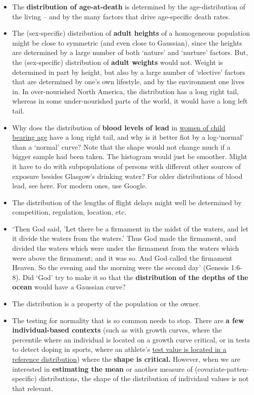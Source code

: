 \documentclass[]{book}
\begin{document}
\begin{itemize}
\item
  The \textbf{distribution of age-at-death} is determined by the age-distribution of the living -- and by the many factors that drive age-specific death rates.
\item
  The (sex-specific) distribution of \textbf{adult heights} of a homogeneous population might be close to symmetric (and even close to Gaussian), since the heights are determined by a large number of both `nature' and `nurture' factors. But, the (sex-specific) distribution of \textbf{adult weights} would not. Weight is determined in part by height, but also by a large number of `elective' factors that are determined by one's own lifestyle, and by the environment one lives in. In over-nourished North America, the distribution has a long right tail, whereas in some under-nourished parts of the world, it would have a long left tail.
\item
  Why does the distribution of \textbf{blood levels of lead} in
  \href{http://www.medicine.mcgill.ca/epidemiology/hanley/c607/ch01/homegrown_exercises_01.pdf\#page=2}{women of child bearing age} have a long right tail, and why is it better fiot by a log-`normal' than a `normal' curve? Note that the shape would not change much if a bigger sample had been taken. The histogram would just be smoother. Might it have to do with subpopulations of persons with different other sources of exposure besides Glasgow's drinking water? For older distributions of blood lead, see here. For modern ones, use Google.
\item
  The distribution of the lengths of flight delays might well be determined by competition, regulation, location, etc.
\item
  `Then God said, 'Let there be a firmament in the midst of the waters, and let it divide the waters from the waters.' Thus God made the firmament, and divided the waters which were under the firmament from the waters which were above the firmament; and it was so. And God called the firmament Heaven. So the evening and the morning were the second day' (Genesis 1:6-8). Did `God' try to make it so that the \textbf{distribution of the depths of the ocean} would have a Gaussian curve?
\item
  The distribution is a property of the population or the owner.
\item
  The testing for normality that is so common needs to stop. There are \textbf{a few individual-based contexts} (such as with growth curves, where the percentile where an individual is located on a growth curve critical, or in tests to detect doping in sports, where an athlete's \href{http://www.medicine.mcgill.ca/epidemiology/hanley/Reprints/TestingForHumanIGFdoping.pdf}{test value is located in a reference distribution}) where the \textbf{shape is critical.} However, when we are interested in \textbf{estimating the mean} or another measure of (covariate-patten-specific) distributions, the shape of the distribution of individaul values is not that relevant.

\end{itemize}
\end{document}
